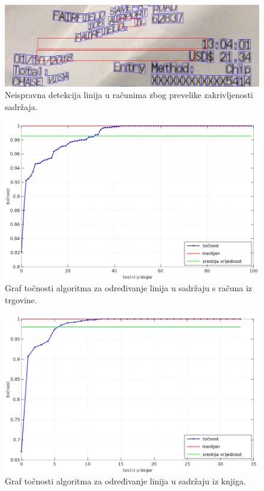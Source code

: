 \documentclass[times, utf8, zavrsni]{fer}
\begin{document}
\

\begin{figure}[!htb]
    \centering
    \captionsetup{justification=centering}
    \includegraphics[width=\textwidth]{images/error-01.png}
    \caption{
        Neispravna detekcija linija u računima zbog prevelike zakrivljenosti
        sadržaja.
    }
    \label{fig:error-01}
\end{figure}

\pagebreak

\begin{figure}[!htb]
    \centering
    \captionsetup{justification=centering}
    \includegraphics[width=\textwidth]{images/result-01.png}
    \caption{
        Graf točnosti algoritma za određivanje linija u sadržaju s računa iz
        trgovine.
    }
    \label{fig:result-01}
\end{figure}

\begin{figure}[!htb]
    \centering
    \captionsetup{justification=centering}
    \includegraphics[width=\textwidth]{images/result-02.png}
    \caption{
        Graf točnosti algoritma za određivanje linija u sadržaju iz knjiga.
    }
    \label{fig:result-02}
\end{figure}
\end{document}
